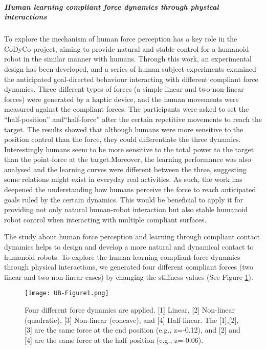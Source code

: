 \subparagraph*{Human learning compliant force dynamics through physical interactions}
To explore the mechanism of human force perception has a key role in the CoDyCo project, aiming to provide natural and stable control for a humanoid robot in the similar manner with humans. Through this work, an experimental design has been developed, and a series of human subject experiments examined the anticipated goal-directed behaviour interacting with different compliant force dynamics. Three different types of forces (a simple linear and two non-linear forces) were generated by a haptic device, and the human movements were measured against the compliant forces. The participants were asked to set the “half-position”  and“half-force”  after the certain repetitive movements to reach the target. The results showed that although humans were more sensitive to the position control than the force, they could differentiate the three dynamics. Interestingly humans seem to be more sensitive to the total power to the target than the point-force at the target.Moreover, the learning performance was also analysed and the learning curves were different between the three, suggesting some relations might exist in everyday real activities. As such, the work has deepened the understanding how humans perceive the force to reach anticipated goals ruled by the certain dynamics. This would be beneficial to apply it for providing not only natural human-robot interaction but also stable humanoid robot control when interacting with multiple compliant surfaces.

The study about human force perception and learning through compliant contact dynamics helps to design and develop a more natural and dynamical contact to humanoid robots. To explore the human learning compliant force dynamics through physical interactions, we generated four different compliant forces (two linear and two non-linear cases) by changing the stiffness values (See Figure \ref{fig:forcedyn}).

\begin{figure}[h!]
	\centering
	\texttt{[image: UB-Figure1.png]}
	\caption{Four different force dynamics are applied. [1] Linear, [2] Non-linear (quadratic), [3] Non-linear (concave), and [4] Half-linear. The [1],[2],[3] are the same force at the end position (e.g., z=-0.12), and [2] and [4] are the same force at the half position  (e.g., z=-0.06).}
	\label{fig:forcedyn}
\end{figure}

\newpage

